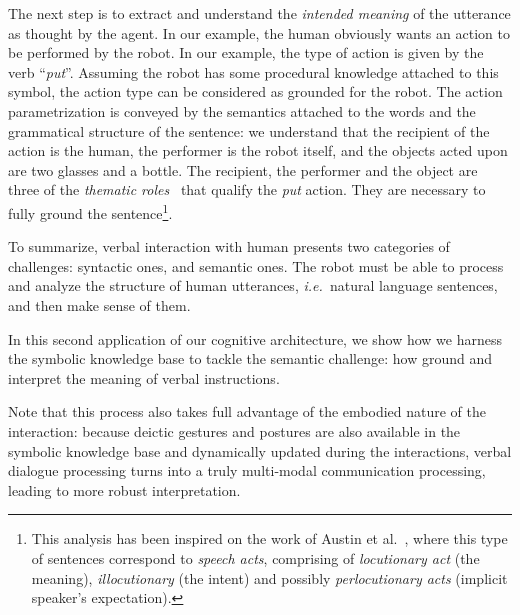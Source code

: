 \documentclass{svmult}
\newcommand{\ie}{{\textit{i.e.~}}}
\begin{document}
The next step is to extract and understand the \emph{intended meaning} of the
utterance as thought by the agent. In our example, the human obviously wants an
action to be performed by the robot. In our example, the type of action is
given by the verb ``\textit{put}''. Assuming the robot has some procedural
knowledge attached to this symbol, the action type can be considered as
grounded for the robot. The action parametrization is conveyed by the semantics
attached to the words and the grammatical structure of the sentence: we
understand that the recipient of the action is the human, the performer is the
robot itself, and the objects acted upon are two glasses and a bottle. The
recipient, the performer and the object are three of the \emph{thematic
roles}~\cite{Gruber1965} that qualify the \emph{put} action. They are necessary
to fully ground the sentence\footnote{This analysis has been inspired on the
work of Austin et al.~\cite{Austin1962}, where this type of sentences
correspond to \emph{speech acts}, comprising of \emph{locutionary act} (the
meaning), \emph{illocutionary} (the intent) and possibly \emph{perlocutionary
acts} (implicit speaker's expectation).}.

To summarize, verbal interaction with human presents two categories of challenges: syntactic
ones, and semantic ones. The robot must be able to process and analyze the
structure of human utterances, \ie natural language sentences, and then make
sense of them. 

In this second application of our cognitive architecture, we show how we
harness the symbolic knowledge base to tackle the semantic challenge: how
ground and interpret the meaning of verbal instructions.

Note that this process also takes full advantage of the embodied nature of the
interaction: because deictic gestures and postures are also available in the
symbolic knowledge base and dynamically updated during the interactions, verbal
dialogue processing turns into a truly multi-modal communication processing,
leading to more robust interpretation.
\end{document}
